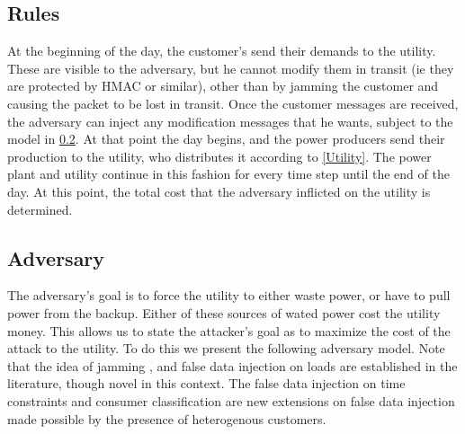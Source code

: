 \documentclass[conference]{IEEEtran}
\begin{document}
\subsection{Rules}
\label{Rules}

At the beginning of the day, the customer's send their demands to the utility.  These are visible to the adversary, but he cannot modify them in transit (ie they are protected by HMAC or similar), other than by jamming the customer and causing the packet to be lost in transit.    Once the customer messages are received, the adversary can inject any modification messages that he wants, subject to the model in \ref{Adversary}.  At that point the day begins, and the power producers send their production to the utility, who distributes it according to \ref{Utility}.  The power plant and utility continue in this fashion for every time step until the end of the day.  At this point, the total cost that the adversary inflicted
on the utility is determined.

\subsection{Adversary}
\label{Adversary}

The adversary's goal is to force the utility to either waste power, or have to pull power from the backup.  Either of these sources of wated power cost the utility money.  This allows us to state the attacker's goal as to maximize the cost of the attack to the utility.  To do this we present the following adversary model.  Note that the idea of jamming \cite{gupta2010optimal}, and false data injection on loads \cite{lin2012false}\cite{yuan2011modeling} are established in the literature, though novel in this context.  The false data injection on time constraints and consumer classification are new extensions on false data injection made possible by the presence of heterogenous customers.
\end{document}
